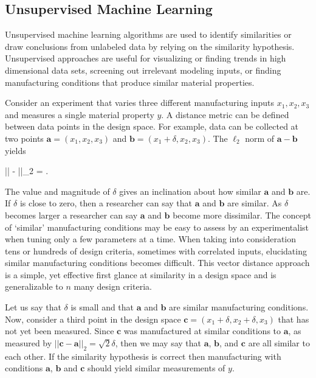 \subsection{Unsupervised Machine Learning}\label{unsupervised}

Unsupervised machine learning algorithms are used to identify similarities or draw conclusions from unlabeled data by relying on the similarity hypothesis. Unsupervised approaches are useful for visualizing or finding trends in high dimensional data sets, screening out irrelevant modeling inputs, or finding manufacturing conditions that produce similar material properties. 

Consider an experiment that varies three different manufacturing inputs $x_1, x_2, x_3$ and measures a single material property $y$. A distance metric can be defined between data points in the design space. For example, data can be collected at two points $\mathbf{a} = (x_{1}, x_{2}, x_{3})$ and $\mathbf{b} = (x_{1} + \delta, x_{2}, x_{3})$. The $\ell _2$ norm of $\mathbf{a}-\mathbf{b}$ yields

\eqn
||  - ||_2 = \delta.
\equ

The value and magnitude of $\delta$ gives an inclination about how similar $\mathbf{a}$ and $\mathbf{b}$ are.
If $\delta$ is close to zero, then a researcher can say that $\mathbf{a}$ and $\mathbf{b}$ are similar.
As $\delta$ becomes larger a researcher can say $\mathbf{a}$ and $\mathbf{b}$ become more dissimilar.
The concept of `similar' manufacturing conditions may be easy to assess by an experimentalist when tuning only a few parameters at a time.
When taking into consideration tens or hundreds of design criteria, sometimes with correlated inputs, elucidating similar manufacturing conditions becomes difficult.
This vector distance approach is a simple, yet effective first glance at similarity in a design space and is generalizable to $n$ many design criteria.

Let us say that $\delta$ is small and that $\mathbf{a}$ and $\mathbf{b}$ are similar manufacturing conditions.
Now, consider a third point in the design space $\mathbf{c} = (x_{1} + \delta, x_2 + \delta, x_3)$ that has not yet been measured.
Since $\mathbf{c}$ was manufactured at similar conditions to $\mathbf{a}$, as measured by $||\mathbf{c} - \mathbf{a}||_2 = \sqrt{2}\delta$, then we may say that $\mathbf{a}$, $\mathbf{b}$, and $\mathbf{c}$ are all similar to each other. If the similarity hypothesis is correct then manufacturing with conditions $\mathbf{a}$, $\mathbf{b}$ and $\mathbf{c}$ should yield similar measurements of $y$.

